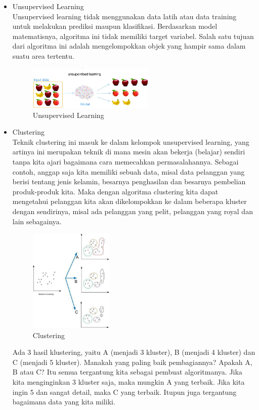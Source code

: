 \begin{enumerate}
\begin{itemize}
\item Unsupervised Learning \\
Unsupervised learning tidak menggunakan data latih atau data training untuk melakukan prediksi maupun klasifikasi. Berdasarkan model matematisnya, algoritma ini tidak memiliki target variabel. Salah satu tujuan dari algoritma ini adalah mengelompokkan objek yang hampir sama dalam suatu area tertentu.
\begin{figure}[H]
    \includegraphics[width=6cm]{figures/1174086/2/un.jpg}
    \centering
    \caption{Unsupervised Learning}
\end{figure}

\item Clustering \\
Teknik clustering ini masuk ke dalam kelompok unsupervised learning, yang artinya ini merupakan teknik di mana mesin akan bekerja (belajar) sendiri tanpa kita ajari bagaimana cara memecahkan permasalahannya.
Sebagai contoh, anggap saja kita memiliki sebuah data, misal data pelanggan yang berisi tentang jenis kelamin, besarnya penghasilan dan besarnya pembelian produk-produk kita. Maka dengan algoritma clustering kita dapat mengetahui pelanggan kita akan dikelompokkan ke dalam beberapa kluster dengan sendirinya, misal ada pelanggan yang pelit, pelanggan yang royal dan lain sebagainya.

\hfill\break
\begin{figure}[H]
    \includegraphics[width=4cm]{figures/1174086/2/clustering.jpg}
    \centering
    \caption{Clustering}
\end{figure}

Ada 3 hasil klustering, yaitu A (menjadi 3 kluster), B (menjadi 4 kluster) dan C (menjadi 5 kluster). Manakah yang paling baik pembagiannya? Apakah A, B atau C? Itu semua tergantung kita sebagai pembuat algoritmanya. Jika kita menginginkan 3 kluster saja, maka mungkin A yang terbaik. Jika kita ingin 5 dan sangat detail, maka C yang terbaik. Itupun juga tergantung bagaimana data yang kita miliki.


\end{itemize}
\end{enumerate}
